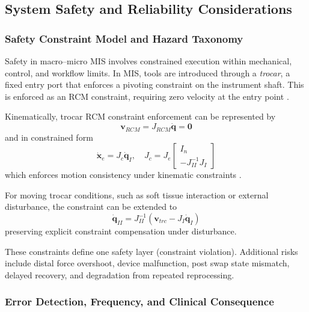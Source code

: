 \documentclass[12pt]{article}
\begin{document}
\subsection{System Safety and Reliability Considerations}
\subsubsection{Safety Constraint Model and Hazard Taxonomy}
Safety in macro--micro MIS involves constrained execution within
mechanical, control, and workflow limits. In MIS, tools
are introduced through a \emph{trocar}, a fixed entry port that enforces a
pivoting constraint on the instrument shaft. This is enforced as an RCM constraint, requiring zero velocity at the entry
point \parencite{burgnerkahrs2015continuum, dupont2022continuum}.

Kinematically, trocar RCM constraint enforcement can be represented by
\begin{equation}
\mathbf{v}_{RCM} = J_{RCM}\dot{\mathbf{q}} = \mathbf{0}
\end{equation}
and in constrained form
\begin{equation}
\dot{\mathbf{x}}_e = J_c\dot{\mathbf{q}}_I,
\quad
J_c = J_e
\begin{bmatrix}
I_n \\
- J_{II}^{-1} J_I
\end{bmatrix}
\end{equation}
which enforces motion consistency under kinematic constraints
\parencite{dupont2022continuum}.

For moving trocar conditions, such as soft tissue interaction or external
disturbance, the constraint can be extended to
\begin{equation}
\dot{\mathbf{q}}_{II} = J_{II}^{-1}\left(\mathbf{v}_{trc}-J_I\dot{\mathbf{q}}_I\right)
\end{equation}
preserving explicit constraint compensation under disturbance.

These constraints define one safety layer (constraint violation). Additional
risks include distal force overshoot, device malfunction, post swap state
mismatch, delayed recovery, and degradation from repeated reprocessing.

\subsubsection{Error Detection, Frequency, and Clinical Consequence}
\end{document}
